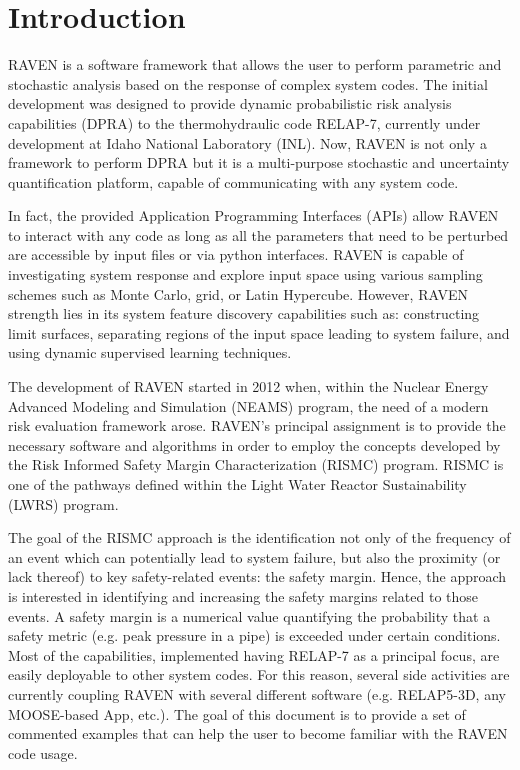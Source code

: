 \section{Introduction}

RAVEN is a software framework that allows the user to perform parametric and stochastic
analysis based on the response of complex system codes.
The initial development was designed to provide dynamic probabilistic risk analysis
capabilities (DPRA) to the thermohydraulic code RELAP-7, currently under development
at Idaho National Laboratory (INL).
Now, RAVEN is not only a framework to perform DPRA but it is a
multi-purpose stochastic and uncertainty quantification platform, capable of communicating with any system code.

In fact, the provided Application Programming
Interfaces (APIs) allow RAVEN to interact with any code as long as all the parameters
that need to be perturbed are accessible by input files or via python
interfaces.
RAVEN is capable of investigating system response and explore input space using various
sampling schemes such as Monte Carlo, grid, or Latin Hypercube.
However, RAVEN strength lies in its system feature discovery capabilities such as: constructing
limit surfaces, separating regions of the input space leading to system failure,
and using dynamic supervised learning techniques.

The development of RAVEN started in 2012 when, within the Nuclear Energy
Advanced Modeling and Simulation (NEAMS) program, the need of a modern
risk evaluation framework arose.
RAVEN's principal assignment is to provide the necessary software and algorithms
in order to employ the concepts developed by the Risk Informed Safety Margin
Characterization (RISMC) program.
RISMC is one of the pathways defined within the Light Water Reactor
Sustainability (LWRS) program.

The goal of the RISMC approach is  the identification not only of the frequency of an
event which can potentially lead to system failure, but also the proximity (or lack
thereof) to key safety-related events: the safety margin.
Hence, the approach is interested in identifying and increasing the safety
margins related to those events.
A safety margin is a numerical value quantifying the probability that a safety
metric (e.g. peak pressure in a pipe) is exceeded under certain conditions.
Most of the capabilities, implemented having RELAP-7 as a principal focus, are
easily deployable to other system codes.
For this reason, several side activities 
are currently coupling RAVEN with several different software (e.g.  RELAP5-3D, any MOOSE-based App, etc.).
The goal of this document is to provide a set of commented examples that can help the user to become familiar 
with the RAVEN code usage.
